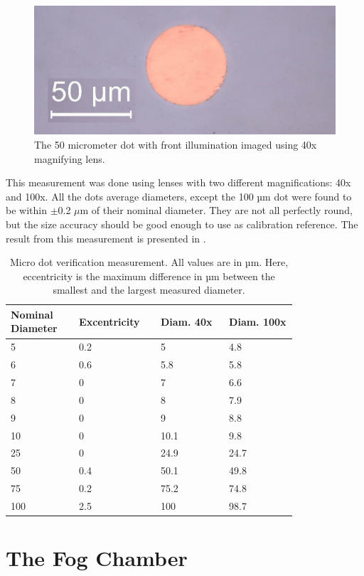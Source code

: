 \begin{figure}[ht]
\centering\includegraphics[width=0.75\linewidth]{./figures/50umdot40x.jpg}
\caption{The 50 micrometer dot with front illumination imaged using 40x magnifying lens.}
\label{fig:50umdot40x}
\end{figure}

This measurement was done using lenses with two different magnifications: 40x and 100x. All the dots average diameters, except the 100 µm dot were found to be within $\pm$0.2 $\mu$m of their nominal diameter. They are not all perfectly round, but the size accuracy should be good enough to use as calibration reference. The result from this measurement is presented in .

\begin{table}[ht]
\centering
\begin{tabular}{p{0.2\linewidth} p{0.2\linewidth} p{0.2\linewidth} p{0.2\linewidth}}
\hline
\textbf{Nominal Diameter} & \textbf{Excentricity} & \textbf{Diam. 40x} & \textbf{Diam. 100x} \\
\hline
5 & 0.2 & 5 & 4.8 \\
6 & 0.6 & 5.8 & 5.8 \\
7 & 0 & 7 & 6.6 \\
8 & 0 & 8 & 7.9 \\
9 & 0 & 9 & 8.8 \\
10 & 0 & 10.1 & 9.8 \\
25 & 0 & 24.9 & 24.7 \\
50 & 0.4 & 50.1 & 49.8 \\
75 & 0.2 & 75.2 & 74.8 \\
100 & 2.5 & 100 & 98.7 \\
\hline
\end{tabular}
\caption{Micro dot verification measurement. All values are in µm. Here, eccentricity is the maximum difference in µm between the smallest and the largest measured diameter.}
\label{tab:ref_meas}
\end{table}



\section{The Fog Chamber}

